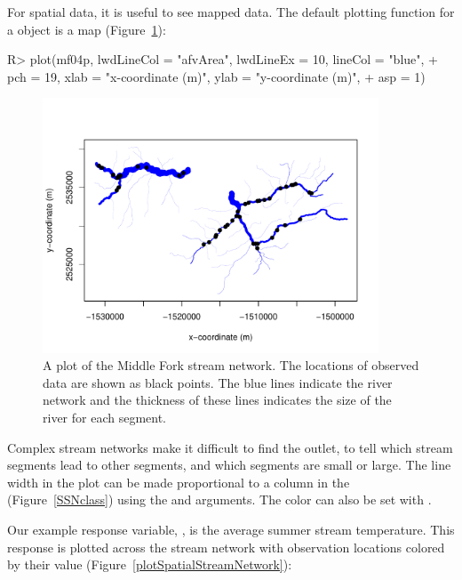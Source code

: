\documentclass[nojss]{jss}
\renewenvironment{Schunk}{\vspace{\topsep}}{\vspace{\topsep}}
\begin{document}
For spatial data, it is useful to see mapped data. The default
plotting function for a  object is a map
(Figure~\ref{LoadData}):

\begin{Schunk}
\begin{Sinput}
R> plot(mf04p, lwdLineCol = "afvArea", lwdLineEx = 10, lineCol = "blue",
+     pch = 19, xlab = "x-coordinate (m)", ylab = "y-coordinate (m)",
+     asp = 1)
\end{Sinput}
\end{Schunk}

\begin{figure}[htbp]
  \begin{center}
    \includegraphics[keepaspectratio=true, width = 100mm]{Figures/jss984Fig-LoadData}
    \caption{A plot of the Middle Fork stream network. The locations
      of observed data are shown as black points. The
      blue lines indicate the river network and the thickness of these
      lines indicates the size of the river for each
      segment. \label{LoadData}}
  \end{center}
\end{figure}

Complex stream networks make it difficult to find the outlet, to tell
which stream segments lead to other segments, and which segments are
small or large. The line width in the plot can be made proportional to
a column in the   (Figure~\ref{SSNclass})
using the  and  arguments. The color
can also be set with .

Our example response variable, , is the average summer stream
temperature.  This response is plotted across the
stream network with observation locations colored by their value
(Figure~\ref{plotSpatialStreamNetwork}):
\end{document}
